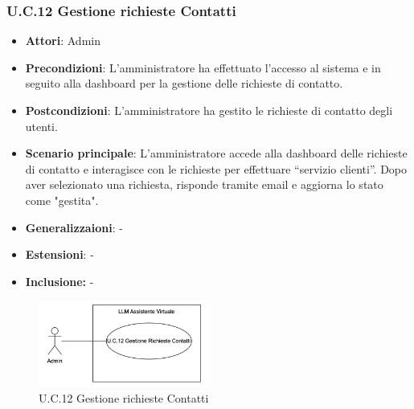 \subsubsection{U.C.12 Gestione richieste Contatti}
\begin{itemize}
    \item \textbf{Attori}: Admin
    \item \textbf{Precondizioni}: L’amministratore ha effettuato l’accesso al sistema e in seguito alla dashboard per la gestione delle richieste di contatto.
    \item \textbf{Postcondizioni}: L’amministratore ha gestito le richieste di contatto degli utenti.
    \item \textbf{Scenario principale}: L’amministratore accede alla dashboard delle richieste di contatto e interagisce con le richieste per effettuare “servizio clienti”. Dopo aver selezionato una richiesta, risponde tramite email e aggiorna lo stato come "gestita".
    \item \textbf{Generalizzaioni}: -
    \item \textbf{Estensioni}: -
    \item \textbf{Inclusione:} -
\end{itemize}
\begin{figure}[h!]
    \centering
    \includegraphics[width=0.5\textwidth]{img/UC12.png}
    \caption{U.C.12 Gestione richieste Contatti}
\end{figure}
